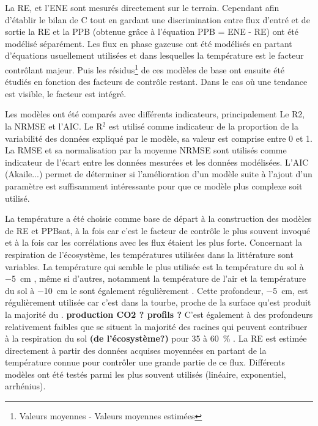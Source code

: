 La RE, et l'ENE sont mesurés directement sur le terrain.
Cependant afin d'établir le bilan de C tout en gardant une discrimination entre flux d'entré et de sortie la RE et la PPB (obtenue grâce à l'équation PPB = ENE - RE) ont été modélisé séparément.
Les flux en phase gazeuse ont été modélisés en partant d'équations usuellement utilisées et dans lesquelles la température est le facteur contrôlant majeur.
Puis les résidus\footnote{Valeurs moyennes - Valeurs moyennes estimées} de ces modèles de base ont ensuite été étudiés en fonction des facteurs de contrôle restant.
Dans le cas où une tendance est visible, le facteur est intégré.

Les modèles ont été comparés avec différents indicateurs, principalement Le R2, la NRMSE et l'AIC.
Le R$^{2}$ est utilisé comme indicateur de la proportion de la variabilité des données expliqué par le modèle, sa valeur est comprise entre 0 et 1.
La RMSE et sa normalisation par la moyenne NRMSE sont utilisés comme indicateur de l'écart entre les données mesurées et les données modélisées.
L'AIC (Akaile...) permet de déterminer si l'amélioration d'un modèle suite à l'ajout d'un paramètre est suffisamment intéressante pour que ce modèle plus complexe soit utilisé.

La température a été choisie comme base de départ à la construction des modèles de RE et PPBsat, à la fois car c'est le facteur de contrôle le plus souvent invoqué et à la fois car les corrélations avec les flux étaient les plus forte.
Concernant la respiration de l'écosystème, les températures utilisées dans la littérature sont variables.
La température qui semble le plus utilisée est la température du sol à \SI{-5}{\centi\metre}  \citep{ballantyne2014}\plop, même si d'autres, notamment la température de l'air et la température du sol à \SI{-10}{\centi\metre} le sont également régulièrement \citep{bortoluzzi2006,kim1992}.
Cette profondeur, \SI{-5}{\cm}, est régulièrement utilisée car c'est dans la tourbe, proche de la surface qu'est produit la majorité du \coo.
\textbf{production CO2 ? profils ?}
C'est également à des profondeurs relativement faibles que se situent la majorité des racines \plop qui peuvent contribuer à la respiration du sol \textbf{(de l'écosystème?)} pour 35 à \SI{60}{\percent} \citep{silvola1996,crow2005}.
La RE est estimée directement à partir des données acquises moyennées en partant de la température connue pour contrôler une grande partie de ce flux.
Différents modèles ont été testés parmi les plus souvent utilisés (linéaire, exponentiel, arrhénius).


